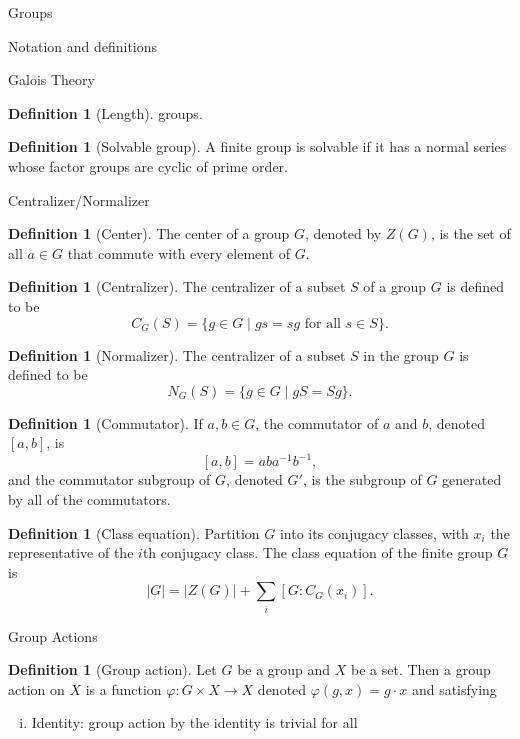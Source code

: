 \documentclass{article}
\theoremstyle{definition}
\numberwithin{theorem}{subsection} %
\theoremstyle{remark}
\theoremstyle{definition}
\newtheorem{definition}[paragraph]{Definition}
\newcommand{\set}[1]{\{#1\}}
\newcommand{\fn}[3]{{#1 \colon #2 \rightarrow #3}}
\begin{document}
\begin{section}{Groups}
\begin{subsection}{Notation and definitions}
\begin{subsubsection}{Galois Theory}
\begin{definition}[Length]
        groups.
      \end{definition}
      \begin{definition}[Solvable group]
        A finite group is solvable if it has a normal series whose factor groups
        are cyclic of prime order.
      \end{definition}
    \end{subsubsection}
    \begin{subsubsection}{Centralizer/Normalizer}
      \begin{definition}[Center] %
        The center of a group $G$, denoted by $Z(G)$, is the set of all
        $a \in G$ that commute with every element of $G$.
      \end{definition}
      \begin{definition}[Centralizer]
        The centralizer of a subset $S$ of a group $G$ is defined to be \[
          C_G(S) = \set{g \in G \mid gs = sg \text{ for all } s \in S}.
        \]
      \end{definition}
      \begin{definition}[Normalizer]
        The centralizer of a subset $S$ in the group $G$ is defined to be \[
          N_G(S) = \set{g \in G \mid gS = Sg}.
        \]
      \end{definition}
      \begin{definition}[Commutator]
        If $a, b \in G$, the commutator of $a$ and $b$, denoted $[a, b]$, is \[
          [a, b] = a b a^{-1} b^{-1},
        \] and the commutator subgroup of $G$, denoted $G'$, is the subgroup of
        $G$ generated by all of the commutators.
      \end{definition}
      \begin{definition}[Class equation]
        Partition $G$ into its conjugacy classes, with $x_i$ the representative
        of the $i$th conjugacy class.
        The class equation of the finite group $G$ is \[
          |G| = |Z(G)| + \sum_{i} [G : C_G(x_i)].
        \]
      \end{definition}
    \end{subsubsection}
    \begin{subsubsection}{Group Actions}
      \begin{definition}[Group action]
        Let $G$ be a group and $X$ be a set. Then a group action on $X$ is a
        function $\fn{\varphi}{G \times X}{X}$ denoted
        $\varphi(g, x) = g \cdot x$ and satisfying \begin{enumerate}[(i)]
          \item Identity: group action by the identity is trivial for all

\end{enumerate}
\end{definition}
\end{subsubsection}
\end{subsection}
\end{section}
\end{document}
